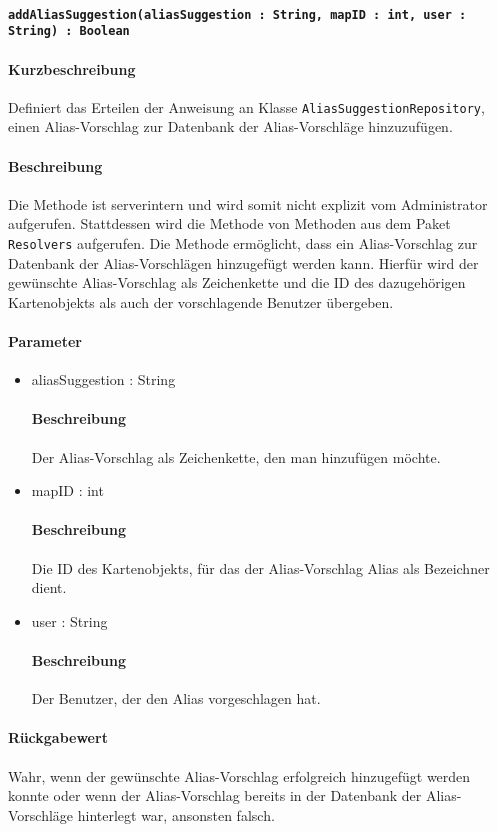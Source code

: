 \paragraph{\texttt{addAliasSuggestion(aliasSuggestion : String, mapID : int, user : String) : Boolean}}%
\paragraph*{Kurzbeschreibung}
Definiert das Erteilen der Anweisung an Klasse \texttt{AliasSuggestionRepository}, einen Alias-Vorschlag zur Datenbank der Alias-Vorschläge hinzuzufügen.
\paragraph*{Beschreibung}
Die Methode ist serverintern und wird somit nicht explizit vom Administrator aufgerufen.
Stattdessen wird die Methode von Methoden aus dem Paket \texttt{Resolvers} aufgerufen.
Die Methode ermöglicht, dass ein Alias-Vorschlag zur Datenbank der Alias-Vorschlägen hinzugefügt werden kann.
Hierfür wird der gewünschte Alias-Vorschlag als Zeichenkette und die ID des dazugehörigen Kartenobjekts als auch der vorschlagende Benutzer übergeben.
\paragraph*{Parameter}
\begin{itemize}
    \item aliasSuggestion : String
    		\paragraph*{Beschreibung}
    		Der Alias-Vorschlag als Zeichenkette, den man hinzufügen möchte.
    \item mapID : int
    		\paragraph*{Beschreibung}
    		Die ID des Kartenobjekts, für das der Alias-Vorschlag Alias als Bezeichner dient.
    	\item user : String
    		\paragraph*{Beschreibung}
    		Der Benutzer, der den Alias vorgeschlagen hat.
\end{itemize}
\paragraph*{Rückgabewert}
Wahr, wenn der gewünschte Alias-Vorschlag erfolgreich hinzugefügt werden konnte oder wenn der Alias-Vorschlag bereits in der Datenbank der Alias-Vorschläge hinterlegt war, ansonsten falsch.
